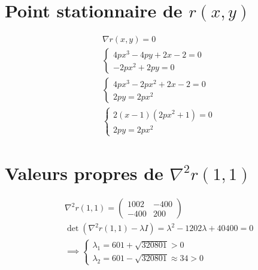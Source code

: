 \documentclass[3p, twocolumn]{elsarticle}
\begin{document}
\begin{appendices}
    \section{Point stationnaire de $r(x,y)$}
    \label{ap:calcul-mini-rosenbrock}
    \begin{align*}
        &\nabla r(x,y) = 0 \\
        &\begin{cases}
            4px^3-4py+2x-2=0\\
            -2px^2+2py=0
        \end{cases}\\
        &\begin{cases}
            4px^3-2px^2+2x-2=0\\
            2py=2px^2
        \end{cases}\\
        &\begin{cases}
            2(x-1)(2px^2+1)=0\\
            2py=2px^2
        \end{cases}
    \end{align*}
    \section{Valeurs propres de $\nabla ^2 r(1,1)$}
    \label{ap:calcul-vp-rosenbrock}
    \begin{align*}
        &\nabla ^2 r(1,1) = 
        \begin{pmatrix}
            1002 & -400\\
            -400 & 200
        \end{pmatrix}\\
        &\det(\nabla ^2 r(1,1)-\lambda I)=\lambda^2-1202\lambda+40400 = 0\\
        &\implies 
        \begin{cases}
            \lambda_1 = 601 + \sqrt{320801} > 0\\
            \lambda_2 = 601 - \sqrt{320801} \approx 34 > 0
        \end{cases}
    \end{align*}
\end{appendices}

\nocite{*}

{\footnotesize
}
{}
\end{document}

